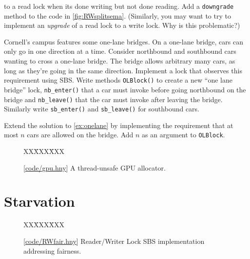 \documentclass{report}
\newcommand{\harmonysource}[1]{
\begin{tabbing}
XX\=XXX\=XXX\kill
    
\end{tabbing}
}
\newcommand{\harmonylink}[1]{%
[\href{https://harmony.cs.cornell.edu/#1}{\underline{#1}}]%
}
\newenvironment{code}{
\tcolorbox
}{
\endtcolorbox
}
\begin{document}
\begin{problems}
to a read lock when its done writing but not done reading.  Add
a \texttt{downgrade} method to the code in \autoref{fig:RWsplitsema}.
(Similarly, you may want to try to implement an \emph{upgrade} of a
read lock to a write lock.  Why is this problematic?)
\item \label{ex:onelane} Cornell's campus features some one-lane bridges.
On a one-lane bridge,
cars can only go in one direction at a time. Consider northbound
and southbound cars wanting to cross a one-lane bridge.
The bridge allows arbitrary many cars, as long as they're going in the
same direction.
Implement a lock that observes this requirement using SBS.
Write methods \texttt{OLBlock()} to create a new ``one lane bridge'' lock,
\texttt{nb\_enter()} that a car must invoke before going northbound on
the bridge and \texttt{nb\_leave()} that the car must invoke after leaving
the bridge.  Similarly write \texttt{sb\_enter()} and \texttt{sb\_leave()}
for southbound cars.
\item Extend the solution to \autoref{ex:onelane} by implementing the
requirement that at most $n$ cars are allowed on the bridge.  Add $n$
as an argument to \texttt{OLBlock}.

\end{problems}

\begin{figure}
\begin{code}
\harmonysource{gpu}
\end{code}
\caption{\harmonylink{code/gpu.hny} A thread-unsafe GPU allocator.}
\label{fig:gpu}
\end{figure}

\chapter{Starvation}
\label{ch:starvation}
%

%

\begin{figure}
\begin{code}
{\small
\harmonysource{RWfair}
}
\end{code}
\caption{\harmonylink{code/RWfair.hny} Reader/Writer Lock SBS implementation addressing fairness.}
\label{fig:RWfair}
\end{figure}
\end{document}
